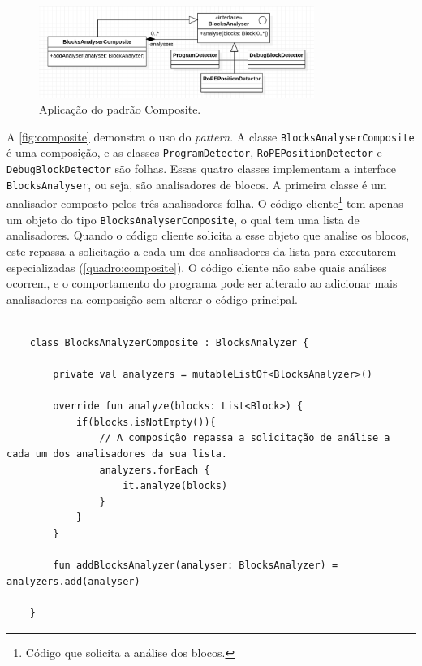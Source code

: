 \begin{figure}
\centering
\includegraphics[width=0.8\textwidth,fbox]{figs/composite_diagram.png}
\caption{Aplicação do padrão Composite.}
\label{fig:composite}
\sourceauthor
\end{figure}

A \autoref{fig:composite} demonstra o uso do \textit{pattern}. A classe \texttt{BlocksAnalyserComposite} é uma composição, e as classes \texttt{ProgramDetector}, \texttt{RoPEPositionDetector} e \texttt{DebugBlockDetector} são folhas. Essas quatro classes implementam a interface \texttt{BlocksAnalyser}, ou seja, são analisadores de blocos. A primeira classe é um analisador composto pelos três analisadores folha.
O código cliente\footnote{Código que solicita a análise dos blocos.} tem apenas um objeto do tipo \texttt{BlocksAnalyserComposite}, o qual tem uma lista de analisadores. Quando o código cliente solicita a esse objeto que analise os blocos, este repassa a solicitação a cada um dos analisadores da lista para executarem especializadas (\autoref{quadro:composite}). O código cliente não sabe quais análises ocorrem, e o comportamento do programa pode ser alterado ao adicionar mais analisadores na composição sem alterar o código principal.

\begin{quadro}[!h]
    \begin{verbatim}
    
    class BlocksAnalyzerComposite : BlocksAnalyzer {

        private val analyzers = mutableListOf<BlocksAnalyzer>()

        override fun analyze(blocks: List<Block>) {
            if(blocks.isNotEmpty()){
                // A composição repassa a solicitação de análise a cada um dos analisadores da sua lista.
                analyzers.forEach {
                    it.analyze(blocks)
                }
            }
        }

        fun addBlocksAnalyzer(analyser: BlocksAnalyzer) = analyzers.add(analyser)
        
    }
    \end{verbatim}
    
    \caption{Implementação da classe de composição.}
    \label{quadro:composite}
\end{quadro}


